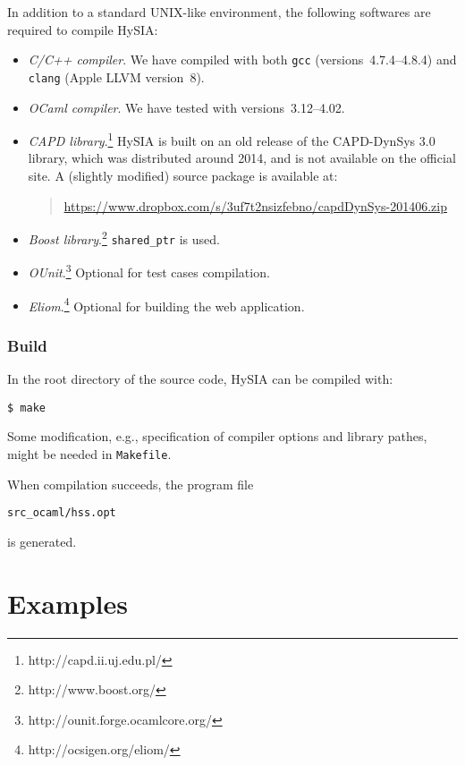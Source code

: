 \documentclass[12pt,a4paper]{article}
\begin{document}
In addition to a standard UNIX-like environment, the following softwares are required to compile HySIA:
\begin{itemize}
    \item \emph{C/C++ compiler}.
        We have compiled with both \verb|gcc| (versions~4.7.4–4.8.4) and \verb|clang| (Apple LLVM version~8).
    \item \emph{OCaml compiler}.
        We have tested with versions~3.12–4.02.
    \item \emph{CAPD library}.\footnote{http://capd.ii.uj.edu.pl/}
        HySIA is built on an old release of the CAPD-DynSys 3.0 library, which was distributed around 2014, and is not available on the official site.
        A (slightly modified) source package is available at:
        \begin{quote}
        \url{https://www.dropbox.com/s/3uf7t2nsizfebno/capdDynSys-201406.zip}
        \end{quote}
    \item \emph{Boost library}.\footnote{http://www.boost.org/}
        \verb|shared_ptr| is used.
    \item \emph{OUnit}.\footnote{http://ounit.forge.ocamlcore.org/} Optional for test cases compilation.
    \item \emph{Eliom}.\footnote{http://ocsigen.org/eliom/} Optional for building the web application.
\end{itemize}


\subsubsection*{Build}

In the root directory of the source code, HySIA can be compiled with:
\begin{verbatim}
$ make
\end{verbatim}

Some modification, e.g., specification of compiler options and library pathes, might be needed in \verb|Makefile|.

When compilation succeeds, the program file
\begin{verbatim}
src_ocaml/hss.opt
\end{verbatim}
is generated.


\section{Examples}
\end{document}

